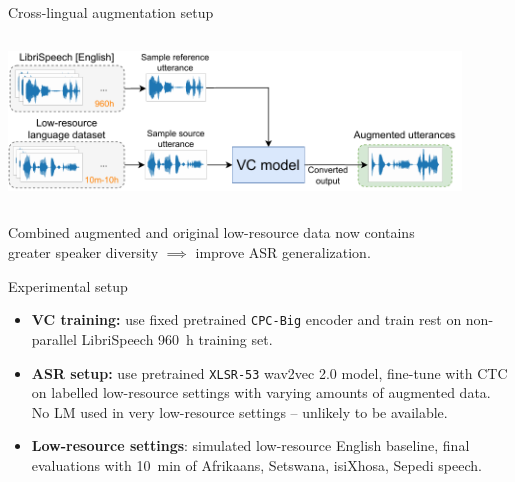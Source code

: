 \documentclass[final]{beamer}
\newcommand{\zeroshot}[1]{\textcolor{tablue20blue}{#1}}
\newcommand{\highqual}[1]{\textcolor{tablue20green}{#1}}
\newcommand{\mybf}[1]{\textcolor{darkestgray}{\textbf{#1}}}
\begin{document}
\begin{frame}[t]
\begin{columns}[T]
\begin{column}{.33\linewidth}
\begin{minipage}[T]{.97\textwidth}
{\begin{block}{Cross-lingual augmentation setup}
\begin{columns}[c]
        \begin{center}
            \centerline{\includegraphics[width=0.9\textwidth,trim={0.0cm 0cm 0.0cm 0cm},clip]{figures/data_aug_cross_lingual.pdf}}
        \end{center}
        
    \end{columns}
    
    \vspace{-0.3cm}

    Combined \highqual{augmented} and original low-resource data now contains \\ \zeroshot{greater speaker diversity} $\implies$ improve ASR generalization.
    
\end{block}

\begin{block}{Experimental setup}
    \begin{itemize}
    \vspace{-0.5cm}
        \setlength{\itemsep}{0.5ex}
        \item \mybf{VC training:} use fixed pretrained \texttt{CPC-Big} encoder and train rest on non-parallel LibriSpeech 960~h training set.
        \item \mybf{ASR setup:} use pretrained \texttt{XLSR-53} wav2vec 2.0 model, fine-tune with CTC on \highqual{labelled low-resource settings with varying amounts of augmented data}. No LM used in very low-resource settings -- unlikely to be available.
        \item \mybf{Low-resource settings}: simulated low-resource English baseline, final evaluations with 10~min of \zeroshot{Afrikaans, Setswana, isiXhosa, Sepedi} speech.
    \end{itemize}
\end{block}

}
\end{minipage}
\end{column}
\end{columns}
\end{frame}
\end{document}
